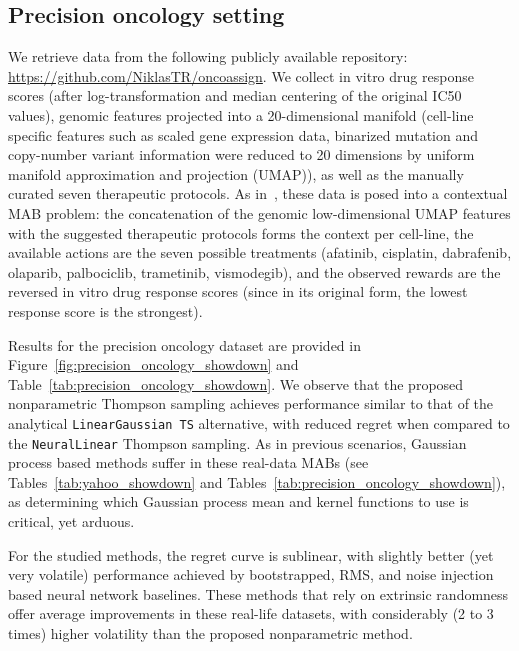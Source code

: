 \subsection{Precision oncology setting}
\label{ssec:evaluation_real_mab_oncology}

We retrieve data from the following publicly available repository: \href{https://github.com/NiklasTR/oncoassign}{https://github.com/NiklasTR/oncoassign}. We collect in vitro drug response scores (after log-transformation and median centering of the original IC50 values), genomic features projected into a 20-dimensional manifold (cell-line specific features such as scaled gene expression data, binarized mutation and copy-number variant information were reduced to 20 dimensions by uniform manifold approximation and projection (UMAP)), as well as the manually curated seven therapeutic protocols. As in~\cite{j-Rindtorff2019}, these data is posed into a contextual MAB problem: the concatenation of the genomic low-dimensional UMAP features with the suggested therapeutic protocols forms the context per cell-line, the available actions are the seven possible treatments (afatinib, cisplatin, dabrafenib, olaparib, palbociclib, trametinib, vismodegib), and the observed rewards are the reversed in vitro drug response scores (since in its original form, the lowest response score is the strongest).

Results for the precision oncology dataset are provided in Figure~\ref{fig:precision_oncology_showdown} and Table~\ref{tab:precision_oncology_showdown}. We observe that the proposed nonparametric Thompson sampling achieves performance similar to that of the analytical \texttt{LinearGaussian TS} alternative, with reduced regret when compared to the \texttt{NeuralLinear} Thompson sampling. As in previous scenarios, Gaussian process based methods suffer in these real-data MABs (see Tables~\ref{tab:yahoo_showdown} and Tables~\ref{tab:precision_oncology_showdown}), as determining which Gaussian process mean and kernel functions to use is critical, yet arduous.

For the studied methods, the regret curve is sublinear, with slightly better (yet very volatile) performance achieved by bootstrapped, RMS, and noise injection based neural network baselines. These methods that rely on extrinsic randomness offer average improvements in these real-life datasets, with considerably (2 to 3 times) higher volatility than the proposed nonparametric method.

